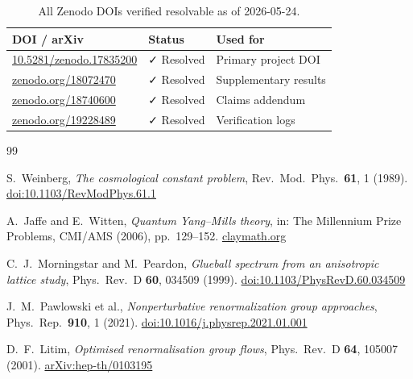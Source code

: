 \documentclass[12pt,a4paper]{article}
\begin{document}
\begin{table}[h!]
  \centering
  \renewcommand{\arraystretch}{1.25}
  \begin{tabular}{lll}
    \toprule
    DOI / arXiv & Status & Used for \\
    \midrule
    \href{https://doi.org/10.5281/zenodo.17835200}{10.5281/zenodo.17835200}
      & ✓ Resolved & Primary project DOI \\
    \href{https://zenodo.org/records/18072470}{zenodo.org/18072470}
      & ✓ Resolved & Supplementary results \\
    \href{https://zenodo.org/records/18740600}{zenodo.org/18740600}
      & ✓ Resolved & Claims addendum \\
    \href{https://zenodo.org/records/19228489}{zenodo.org/19228489}
      & ✓ Resolved & Verification logs \\
    \bottomrule
  \end{tabular}
  \caption{All Zenodo DOIs verified resolvable as of 2026-05-24.}
  \label{tab:dois}
\end{table}

\begin{thebibliography}{99}

S.~Weinberg,
\textit{The cosmological constant problem},
Rev.\ Mod.\ Phys.\ \textbf{61}, 1 (1989).
\href{https://doi.org/10.1103/RevModPhys.61.1}{doi:10.1103/RevModPhys.61.1}

A.~Jaffe and E.~Witten,
\textit{Quantum Yang--Mills theory},
in: The Millennium Prize Problems,
CMI/AMS (2006), pp.\ 129--152.
\href{https://www.claymath.org/millennium-problems}{claymath.org}

C.~J.~Morningstar and M.~Peardon,
\textit{Glueball spectrum from an anisotropic lattice study},
Phys.\ Rev.\ D \textbf{60}, 034509 (1999).
\href{https://doi.org/10.1103/PhysRevD.60.034509}{doi:10.1103/PhysRevD.60.034509}

J.~M.~Pawlowski et al.,
\textit{Nonperturbative renormalization group approaches},
Phys.\ Rep.\ \textbf{910}, 1 (2021).
\href{https://doi.org/10.1016/j.physrep.2021.01.001}{doi:10.1016/j.physrep.2021.01.001}

D.~F.~Litim,
\textit{Optimised renormalisation group flows},
Phys.\ Rev.\ D \textbf{64}, 105007 (2001).
\href{https://arxiv.org/abs/hep-th/0103195}{arXiv:hep-th/0103195}

\end{thebibliography}
\end{document}
